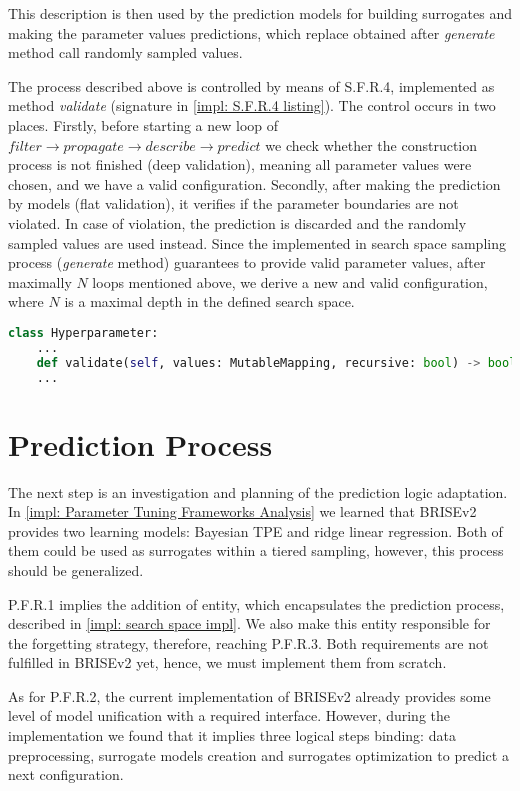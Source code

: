 This description is then used by the prediction models for building surrogates and making the parameter values predictions, which replace obtained after \emph{generate} method call randomly sampled values.

The process described above is controlled by means of S.F.R.4, implemented as method \emph{validate} (signature in \cref{impl: S.F.R.4 listing}). The control occurs in two places. Firstly, before starting a new loop of $filter \rightarrow propagate \rightarrow describe \rightarrow predict$ we check whether the construction process is not finished (deep validation), meaning all parameter values were chosen, and we have a valid configuration. Secondly, after making the prediction by models (flat validation), it verifies if the parameter boundaries are not violated. In case of violation, the prediction is discarded and the randomly sampled values are used instead. Since the implemented in search space sampling process (\emph{generate} method) guarantees to provide valid parameter values, after maximally $N$ loops mentioned above, we derive a new and valid configuration, where $N$ is a maximal depth in the defined search space.

\begin{lstlisting}[language=Python, caption=S.F.R.4 implementation., label=impl: S.F.R.4 listing]
class Hyperparameter:
	...
	def validate(self, values: MutableMapping, recursive: bool) -> bool
	...
\end{lstlisting}


\section{Prediction Process}\label{impl: prediction logic}
The next step is an investigation and planning of the prediction logic adaptation.
In \cref{impl: Parameter Tuning Frameworks Analysis} we learned that BRISEv2 provides two learning models: Bayesian TPE and ridge linear regression. Both of them could be used as surrogates within a tiered sampling, however, this process should be generalized.

P.F.R.1 implies the addition of entity, which encapsulates the prediction process, described in \cref{impl: search space impl}. We also make this entity responsible for the forgetting strategy, therefore, reaching P.F.R.3. Both requirements are not fulfilled in BRISEv2 yet, hence, we must implement them from scratch.

As for P.F.R.2, the current implementation of BRISEv2 already provides some level of model unification with a required interface. However, during the implementation we found that it implies three logical steps binding: data preprocessing, surrogate models creation and surrogates optimization to predict a next configuration.

